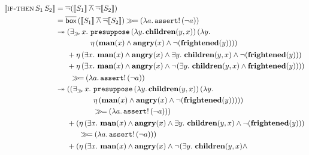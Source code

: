 \begin{align*}
  \sem{\app{\abs{if-then}}{S_1}{S_2}}
  &= \dnot (\sem{S_1} \dand \dnot \sem{S_2}) \\
  &= \ap{\DBOX}{(\sem{S_1} \dand \dnot \sem{S_2})} \hsbind (\lam{a}{\ap{\op{assert}!}{(\lnot a)}}) \\
  &\tto \begin{aligned}[t]
    &(\existsr x.\ \begin{aligned}[t]
         &\app{\op{presuppose}}{(\lam{y}{\obj{children}(y, x)})}{(\lam{y}{ \\
         &\etaE{(\obj{man}(x) \land \obj{angry}(x) \land \lnot (\obj{frightened}(y)))}})}
       \end{aligned} \\
    &+ \etaE{(\exists x.\ \obj{man}(x) \land \obj{angry}(x) \land
              \exists y.\ \obj{children}(y, x) \land
              \lnot (\obj{frightened}(y)))} \\
    &+ \etaE{(\exists x.\ \obj{man}(x) \land \obj{angry}(x) \land
              \lnot (\exists y.\ \obj{children}(y, x) \land
              \obj{frightened}(y)))})
    \end{aligned} \\
  &\qquad \hsbind (\lam{a}{\ap{\op{assert}!}{(\lnot a)}}) \\
  &\tto \begin{aligned}[t]
     &((\existsr x.\ \begin{aligned}[t]
         &\app{\op{presuppose}}{(\lam{y}{\obj{children}(y, x)})}{(\lam{y}{ \\
         &\etaE{(\obj{man}(x) \land \obj{angry}(x) \land \lnot (\obj{frightened}(y)))}})}) \\
         &\hsbind (\lam{a}{\ap{\op{assert}!}{(\lnot a)}})) \\
       \end{aligned} \\
     &+ (\begin{aligned}[t]
           &\etaE{(\exists x.\ \obj{man}(x) \land \obj{angry}(x) \land
                   \exists y.\ \obj{children}(y, x) \land
                   \lnot (\obj{frightened}(y)))} \\
           &\hsbind (\lam{a}{\ap{\op{assert}!}{(\lnot a)}}))
         \end{aligned} \\
     &+ (\begin{aligned}[t]
           &\etaE{(\exists x.\ \obj{man}(x) \land \obj{angry}(x) \land
                  \lnot (\exists y.\ \obj{children}(y, x) \land
}
\end{aligned}
\end{aligned}
\end{align*}
